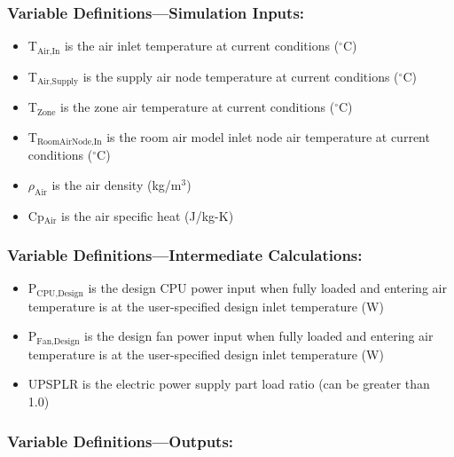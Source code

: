 \subsubsection{Variable Definitions---Simulation Inputs:}\label{variable-definitions-simulation-inputs}

\begin{itemize}
\tightlist
\item
  T$_\textrm{Air,In}$ is the air inlet temperature at current conditions ($^\circ$C)
\item
  T$_\textrm{Air,Supply}$ is the supply air node temperature at current conditions ($^\circ$C)
\item
  T$_\textrm{Zone}$ is the zone air temperature at current conditions ($^\circ$C)
\item
  T$_\textrm{RoomAirNode,In}$ is the room air model inlet node air temperature at current conditions ($^\circ$C)
\item
  $\rho_\textrm{Air}$ is the air density (kg/m$^3$)
\item
  Cp$_\textrm{Air}$ is the air specific heat (J/kg-K)
\end{itemize}

\subsubsection{Variable Definitions---Intermediate Calculations:}\label{variable-definitions-intermediate-calculations}

\begin{itemize}
\tightlist
\item
  P$_\textrm{CPU,Design}$ is the design CPU power input when fully loaded and entering air temperature is at the user-specified design inlet temperature (W)
\item
  P$_\textrm{Fan,Design}$ is the design fan power input when fully loaded and entering air temperature is at the user-specified design inlet temperature (W)
\item
  UPSPLR is the electric power supply part load ratio (can be greater than 1.0)
\end{itemize}

\subsubsection{Variable Definitions---Outputs:}\label{variable-definitions-outputs}

